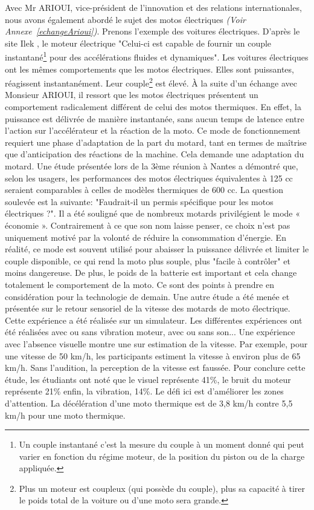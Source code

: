 Avec Mr ARIOUI, vice-président de l’innovation et des relations internationales, nous avons également abordé le sujet des motos électriques \emph{(Voir Annexe~\ref{echangeArioui})}. Prenons l'exemple des voitures électriques.
D'après le site Ilek \cite{voiture_electrique}, le moteur électrique "Celui-ci est capable de fournir un couple instantané\footnote{Un couple instantané c’est la mesure du couple à un moment donné qui peut varier en fonction du régime moteur, de la position du piston ou de la charge appliquée.} pour des accélérations fluides et dynamiques". Les voitures électriques ont les mêmes comportements que les motos électriques. Elles sont puissantes, réagissent instantanément. Leur couple\footnote{Plus un moteur est coupleux (qui possède du couple), plus sa capacité à tirer le poids total de la voiture ou d'une moto sera grande.} est élevé.
À la suite d’un échange avec Monsieur ARIOUI, il ressort que les motos électriques présentent un comportement radicalement différent de celui des motos thermiques. En effet, la puissance est délivrée de manière instantanée, sans aucun temps de latence entre l’action sur l’accélérateur et la réaction de la moto. Ce mode de fonctionnement requiert une phase d’adaptation de la part du motard, tant en termes de maîtrise que d’anticipation des réactions de la machine. Cela demande une adaptation du motard. Une étude présentée lors de la 3ème réunion  \cite{reunionProjet2025} à Nantes a démontré que, selon les usagers, les performances des motos électriques équivalentes à 125 cc seraient comparables à celles de modèles thermiques de 600 cc. La question soulevée est la suivante: "Faudrait-il un permis spécifique pour les motos électriques ?".
Il a été souligné que de nombreux motards privilégient le mode « économie ». Contrairement à ce que son nom laisse penser, ce choix n’est pas uniquement motivé par la volonté de réduire la consommation d'énergie. En réalité, ce mode est souvent utilisé pour abaisser la puissance délivrée et limiter le couple disponible, ce qui rend la moto plus souple, plus "facile à contrôler" et moins dangereuse. 
De plus, le poids de la batterie est important et cela change totalement le comportement de la moto. Ce sont des points à prendre en considération pour la technologie de demain.
Une autre étude a été menée et présentée\cite{reunionProjet2025} sur le retour sensoriel de la vitesse des motards de moto électrique. Cette expérience a été réalisée sur un simulateur. Les différentes expériences ont été réalisées avec ou sans vibration moteur, avec ou sans son... Une expérience avec l'absence visuelle montre une sur estimation de la vitesse. Par exemple, pour une vitesse de 50 km/h, les participants estiment la vitesse à environ plus de 65 km/h. Sans l'audition, la perception de la vitesse est faussée. Pour conclure cette étude, les étudiants ont noté que le visuel représente 41\%, le bruit du moteur représente 21\% enfin, la vibration, 14\%. Le défi ici est d'améliorer les zones d'attention. La décélération d'une moto thermique est de 3,8 km/h contre 5,5 km/h pour une moto thermique.
\vspace{0.5cm} %

